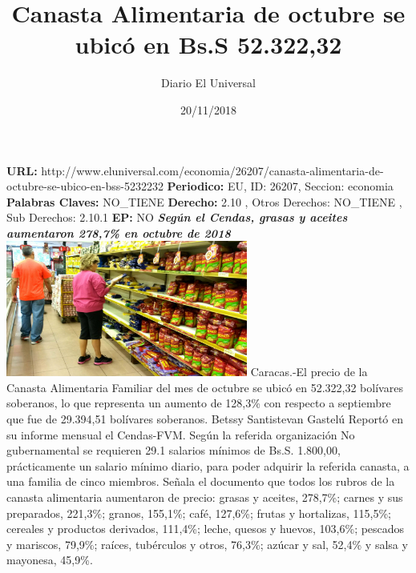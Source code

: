 \documentclass{article}%
\title{\textbf{Canasta Alimentaria de octubre se ubicó en Bs.S 52.322,32}}%
\author{Diario El Universal}%
\date{20/11/2018}%
\begin{document}
%
\normalsize%
\maketitle%
\textbf{URL: }%
http://www.eluniversal.com/economia/26207/canasta{-}alimentaria{-}de{-}octubre{-}se{-}ubico{-}en{-}bss{-}5232232\newline%
%
\textbf{Periodico: }%
EU, %
ID: %
26207, %
Seccion: %
economia\newline%
%
\textbf{Palabras Claves: }%
NO\_TIENE\newline%
%
\textbf{Derecho: }%
2.10%
, Otros Derechos: %
NO\_TIENE%
, Sub Derechos: %
2.10.1%
\newline%
%
\textbf{EP: }%
NO\newline%
\newline%
%
\textbf{\textit{Según el Cendas, grasas y aceites aumentaron 278,7\% en octubre de 2018}}%
\newline%
\newline%
%
\includegraphics[width=300px]{29.jpg}%
\newline%
%
Caracas.{-}El precio de la Canasta Alimentaria Familiar del mes de octubre se ubicó en 52.322,32 bolívares soberanos, lo que representa un aumento de 128,3\% con respecto a septiembre que fue de 29.394,51 bolívares soberanos.%
\newline%
%
Betssy Santistevan Gastelú%
\newline%
%
Reportó en su informe mensual el Cendas{-}FVM.%
\newline%
%
Según la referida organización No gubernamental se requieren 29.1 salarios mínimos de Bs.S. 1.800,00, prácticamente un salario mínimo diario, para poder adquirir la referida canasta, a una familia de cinco miembros.%
\newline%
%
Señala el documento que todos los rubros de la canasta alimentaria aumentaron de precio: grasas y aceites, 278,7\%; carnes y sus preparados, 221,3\%; granos, 155,1\%; café, 127,6\%; frutas y hortalizas, 115,5\%; cereales y productos derivados, 111,4\%; leche, quesos y huevos, 103,6\%; pescados y mariscos, 79,9\%; raíces, tubérculos y otros, 76,3\%; azúcar y sal, 52,4\% y salsa y mayonesa, 45,9\%.%
\end{document}

